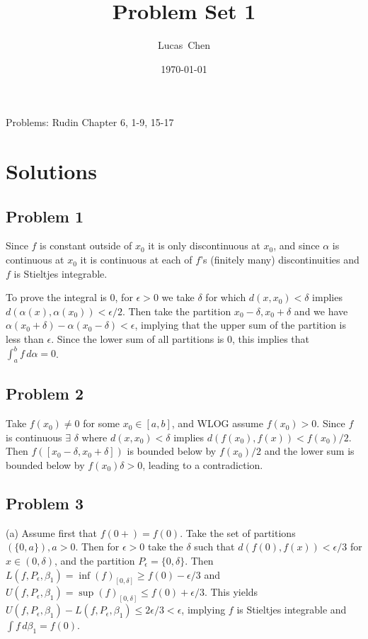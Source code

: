 \documentclass{amsart}
\title{Problem Set 1}
\author{Lucas\ Chen}
\date{\today}
\begin{document}
\maketitle

Problems: Rudin Chapter 6, 1-9, 15-17

\section*{Solutions}

\subsection*{Problem 1}
Since $f$ is constant outside of $x_0$ it is only discontinuous at $x_0$, and since $\alpha$ is continuous at $x_0$ it is continuous at each of $f$'s (finitely many) discontinuities and $f$ is Stieltjes integrable.

\medskip \noindent To prove the integral is $0$, for $\epsilon>0$ we take $\delta$ for which $d(x, x_0)<\delta$ implies $d(\alpha(x), \alpha(x_0))<\epsilon/2$. Then take the partition $x_0-\delta, x_0+\delta$ and we have $\alpha(x_0+\delta)-\alpha(x_0-\delta)<\epsilon$, implying that the upper sum of the partition is less than $\epsilon$. Since the lower sum of all partitions is $0$, this implies that $\int_a^b f\, d\alpha=0$. 

\subsection*{Problem 2}
Take $f(x_0)\neq 0$ for some $x_0\in [a,b]$, and WLOG assume $f(x_0)>0$. Since $f$ is continuous $\exists$ $\delta$ where $d(x, x_0)<\delta$ implies $d(f(x_0), f(x))<f(x_0)/2$. Then $f([x_0-\delta, x_0+\delta])$ is bounded below by $f(x_0)/2$ and the lower sum is bounded below by $f(x_0)\delta>0$, leading to a contradiction. 

\subsection*{Problem 3}

\medskip \noindent (a) Assume first that $f(0+)=f(0)$. Take the set of partitions $(\{0,a\}), a>0$. Then for $\epsilon>0$ take the $\delta$ such that $d(f(0), f(x))<\epsilon/3$ for $x\in (0, \delta)$, and the partition $P_{\epsilon}=\{0, \delta\}$. Then $L(f, P_{\epsilon}, \beta_1)=\inf(f)_{[0,\delta]}\geq f(0)-\epsilon/3$ and $U(f,P_{\epsilon},\beta_1)=\sup(f)_{[0,\delta]}\leq f(0)+\epsilon/3$. This yields $U(f,P_{\epsilon},\beta_1)-L(f,P_{\epsilon},\beta_1)\leq 2\epsilon/3<\epsilon$, implying $f$ is Stieltjes integrable and $\int f\, d\beta_1= f(0)$.
\end{document}
